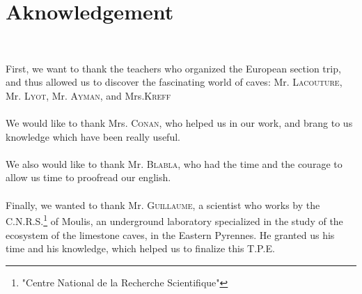\documentclass[draft, final]{report}
\begin{document}
\chapter*{Aknowledgement}
~\par
First, we want to thank the teachers who organized the European section trip, and thus allowed us to discover the fascinating world of caves: Mr. \textsc{Lacouture}, Mr. \textsc{Lyot}, Mr. \textsc{Ayman}, and Mrs.\textsc{Kreff} \\
~\\
We would like to thank Mrs. \textsc{Conan}, who helped us in our work, and brang to us knowledge which have been really useful.\\
~\\
We also would like to thank Mr. \textsc{Blabla}, who had the time and the courage to allow us time to proofread our english.\\
~\\
Finally, we wanted to thank Mr. \textsc{Guillaume}, a scientist who works by the C.N.R.S.\footnote{"Centre National de la Recherche Scientifique"} of Moulis, an underground laboratory specialized in the study of the ecosystem of the limestone caves, in the Eastern Pyrennes. He granted us his time and his knowledge, which helped us to finalize this T.P.E.

\nocite{*}
\printbibliography
\end{document}
